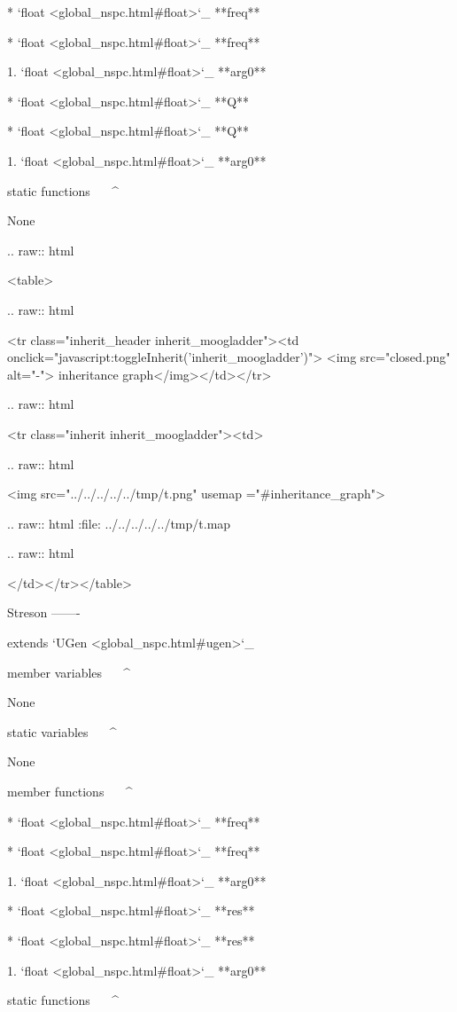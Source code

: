 	* `float <global_nspc.html#float>`_ **freq**

	* `float <global_nspc.html#float>`_ **freq**

		1. `float <global_nspc.html#float>`_ **arg0**

	* `float <global_nspc.html#float>`_ **Q**

	* `float <global_nspc.html#float>`_ **Q**

		1. `float <global_nspc.html#float>`_ **arg0**

static functions
^^^^^^^^^^^^^^^^


	None


  .. raw:: html

   <table>


  .. raw:: html

   <tr class="inherit_header inherit_moogladder"><td onclick="javascript:toggleInherit('inherit_moogladder')"> <img src="closed.png" alt="-"> inheritance graph</img></td></tr>


  .. raw:: html

   <tr class="inherit inherit_moogladder"><td>


  .. raw:: html

   <img src="../../../../../tmp/t.png" usemap ="#inheritance_graph">


  .. raw:: html
   :file:   ../../../../../tmp/t.map


  .. raw:: html

   </td></tr></table>

Streson
-------

extends `UGen <global_nspc.html#ugen>`_ 

member variables
^^^^^^^^^^^^^^^^

	None

static variables
^^^^^^^^^^^^^^^^

	None

member functions
^^^^^^^^^^^^^^^^

	* `float <global_nspc.html#float>`_ **freq**

	* `float <global_nspc.html#float>`_ **freq**

		1. `float <global_nspc.html#float>`_ **arg0**

	* `float <global_nspc.html#float>`_ **res**

	* `float <global_nspc.html#float>`_ **res**

		1. `float <global_nspc.html#float>`_ **arg0**

static functions
^^^^^^^^^^^^^^^^


